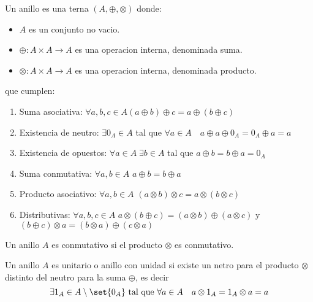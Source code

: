 \begin{definition}[Anillo]
	Un anillo es una terna \((A, \oplus, \otimes )\) donde:
	\begin{itemize}
		\item \(A \) es un conjunto no vacio.
		\item \(\oplus : A \times A \to A \) es una operacion interna, denominada suma.
		\item \(\otimes : A \times A \to A \) es una operacion interna, denominada producto.
	\end{itemize}
	que cumplen:
	\begin{enumerate}
		\item Suma asociativa: \(\forall a,b,c \in A (a \oplus b ) \oplus c = a \oplus (b \oplus c )\)
		\item Existencia de neutro: \(\exists 0_A \in A \) tal que \(\forall  a \in A \quad a \oplus a \oplus 0_A = 0_A \oplus a = a \)
		\item Existencia de opuestos: \(\forall a \in A \; \exists b \in A \) tal que \(a \oplus b = b \oplus a = 0_A \)
		\item Suma conmutativa: \(\forall a,b \in A \) \(a \oplus b = b \oplus a \)
		\item Producto asociativo: \(\forall a,b \in A \) \((a \otimes b) \otimes c = a \otimes (b \otimes c )\)
		\item Distributivas: \(\forall a,b,c \in A \) \(a \otimes (b \oplus c) = (a\otimes b) \oplus (a \otimes c) \) y \((b \oplus c) \otimes a = (b \otimes a) \oplus (c \otimes a )\)
	\end{enumerate}
\end{definition}

\begin{definition}
	Un anillo \(A \) es conmutativo si el producto \(\otimes \) es conmutativo.
\end{definition}
\begin{definition}
	Un anillo \(A \) es unitario o anillo con unidad si existe un netro para el producto \(\otimes \) distinto del neutro para la suma \(\oplus \), es decir
	\[
		\exists 1_A \in A \setminus \set{0_A } \text{ tal que } \forall a \in A \quad a \otimes 1_A = 1_A \otimes a = a
	\]
\end{definition}

